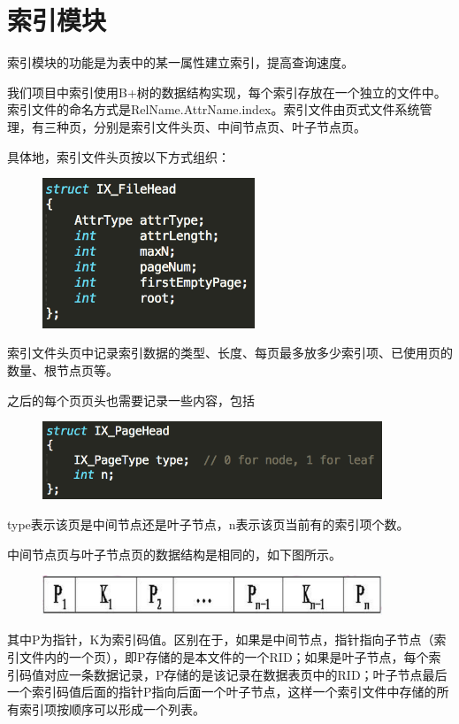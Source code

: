 \section{索引模块}
索引模块的功能是为表中的某一属性建立索引，提高查询速度。

我们项目中索引使用B+树的数据结构实现，每个索引存放在一个独立的文件中。索引文件的命名方式是RelName.AttrName.index。索引文件由页式文件系统管理，有三种页，分别是索引文件头页、中间节点页、叶子节点页。

具体地，索引文件头页按以下方式组织：
\begin{figure}[H]
\centering
\includegraphics[width=2.5in]{Figures/IX_FileHead.png}
\end{figure}

 索引文件头页中记录索引数据的类型、长度、每页最多放多少索引项、已使用页的数量、根节点页等。

 之后的每个页页头也需要记录一些内容，包括
 \begin{figure}[H]
\centering
\includegraphics[width=4in]{Figures/IX_PageHead.png}
\end{figure}

type表示该页是中间节点还是叶子节点，n表示该页当前有的索引项个数。

中间节点页与叶子节点页的数据结构是相同的，如下图所示。
\begin{figure}[H]
\centering
\includegraphics[width=4in]{Figures/indexstruct.png}
\end{figure}

其中P为指针，K为索引码值。区别在于，如果是中间节点，指针指向子节点（索引文件内的一个页），即P存储的是本文件的一个RID；如果是叶子节点，每个索引码值对应一条数据记录，P存储的是该记录在数据表页中的RID；叶子节点最后一个索引码值后面的指针P指向后面一个叶子节点，这样一个索引文件中存储的所有索引项按顺序可以形成一个列表。

